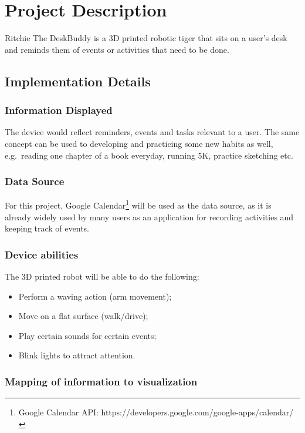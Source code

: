\documentclass{sigchi-ext}
\begin{document}
\section{Project Description}

Ritchie The DeskBuddy is a 3D printed robotic tiger that sits on a user's desk
and reminds them of events or activities that need to be done.

\subsection{Implementation Details}

\subsubsection{Information Displayed}

The device would reflect reminders, events and tasks relevant to a user. The
same concept can be used to developing and practicing some new habits as well,
e.g.\ reading one chapter of a book everyday, running 5K, practice sketching
etc.

\subsubsection{Data Source}

For this project, Google Calendar\footnote{Google Calendar API:
https://developers.google.com/google-apps/calendar/} will be used as the data
source, as it is already widely used by many users as an application for
recording activities and keeping track of events.

\subsubsection{Device abilities}

The 3D printed robot will be able to do the following:
\begin{itemize}
  \item Perform a waving action (arm movement);
  \item Move on a flat surface (walk/drive);
  \item Play certain sounds for certain events;
  \item Blink lights to attract attention.
\end{itemize}

\subsubsection{Mapping of information to visualization}
\end{document}
